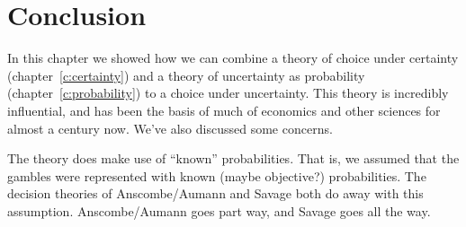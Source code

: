 \section{Conclusion}

In this chapter we showed how we can combine a theory of choice under certainty (chapter~\ref{c:certainty}) and a theory of uncertainty as probability (chapter~\ref{c:probability}) to a choice under uncertainty.  This theory is incredibly influential, and has been the basis of much of economics and other sciences for almost a century now.  We've also discussed some concerns.

The theory does make use of ``known'' probabilities.  That is, we assumed that the gambles were represented with known (maybe objective?) probabilities.  The decision theories of Anscombe/Aumann and Savage both do away with this assumption.  Anscombe/Aumann goes part way, and Savage goes all the way. 